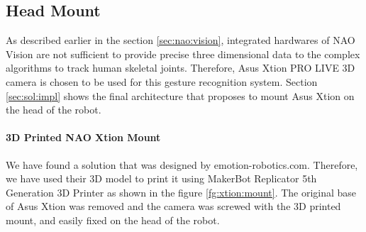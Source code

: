 \subsection{Head Mount} 
As described earlier in the section \ref{sec:nao:vision}, integrated hardwares of NAO Vision are not sufficient to provide precise three dimensional data to the complex algorithms to track human skeletal joints. Therefore, Asus Xtion PRO LIVE 3D camera is chosen to be used for this gesture recognition system. Section \ref{sec:sol:impl} shows the final architecture that proposes to mount Asus Xtion on the head of the robot. 



\paragraph*{3D Printed NAO Xtion Mount} We have found a solution that was designed by emotion-robotics.com. Therefore, we have used their 3D model to print it using MakerBot Replicator 5th Generation 3D Printer as shown in the figure \ref{fg:xtion:mount}. The original base of Asus Xtion was removed and the camera was screwed with the 3D printed mount, and easily fixed on the head of the robot. 

